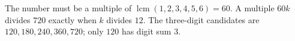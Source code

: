 The number must be a multiple of $\operatorname{lcm}(1,2,3,4,5,6)=60$. A multiple $60k$ divides $720$ exactly when $k$ divides $12$. The three-digit candidates are $120,180,240,360,720$; only $\boxed{120}$ has digit sum $3$.
